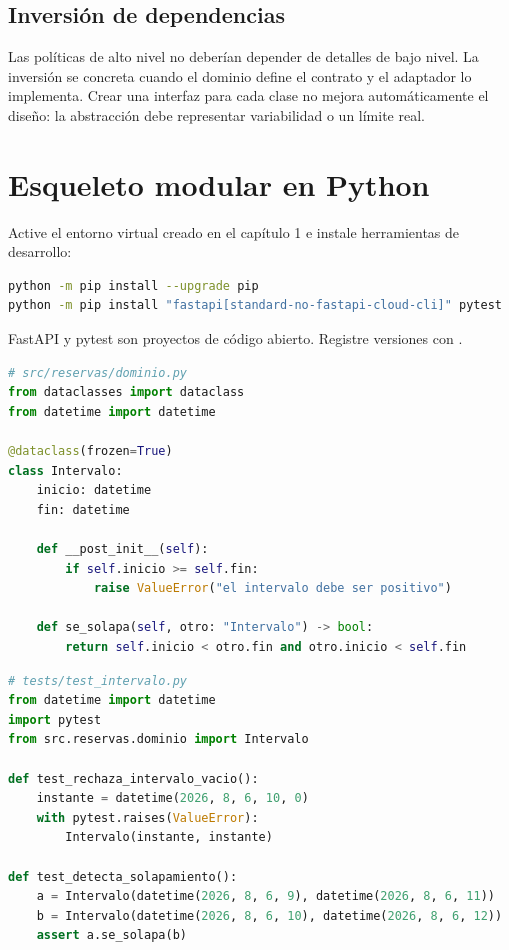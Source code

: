 \subsection{Inversión de dependencias}
Las políticas de alto nivel no deberían depender de detalles de bajo nivel. La inversión se concreta cuando el dominio define el contrato y el adaptador lo implementa. Crear una interfaz para cada clase no mejora automáticamente el diseño: la abstracción debe representar variabilidad o un límite real.

\section{Esqueleto modular en Python}
\begin{instalacion}
Active el entorno virtual creado en el capítulo 1 e instale herramientas de desarrollo:
\begin{lstlisting}[language=bash]
python -m pip install --upgrade pip
python -m pip install "fastapi[standard-no-fastapi-cloud-cli]" pytest
\end{lstlisting}
FastAPI y pytest son proyectos de código abierto. Registre versiones con .
\end{instalacion}

\begin{lstlisting}[language=Python]
# src/reservas/dominio.py
from dataclasses import dataclass
from datetime import datetime

@dataclass(frozen=True)
class Intervalo:
    inicio: datetime
    fin: datetime

    def __post_init__(self):
        if self.inicio >= self.fin:
            raise ValueError("el intervalo debe ser positivo")

    def se_solapa(self, otro: "Intervalo") -> bool:
        return self.inicio < otro.fin and otro.inicio < self.fin
\end{lstlisting}

\begin{lstlisting}[language=Python]
# tests/test_intervalo.py
from datetime import datetime
import pytest
from src.reservas.dominio import Intervalo

def test_rechaza_intervalo_vacio():
    instante = datetime(2026, 8, 6, 10, 0)
    with pytest.raises(ValueError):
        Intervalo(instante, instante)

def test_detecta_solapamiento():
    a = Intervalo(datetime(2026, 8, 6, 9), datetime(2026, 8, 6, 11))
    b = Intervalo(datetime(2026, 8, 6, 10), datetime(2026, 8, 6, 12))
    assert a.se_solapa(b)
\end{lstlisting}

